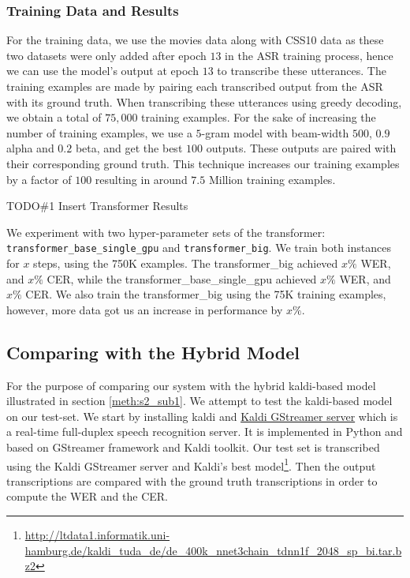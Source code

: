 \subsubsection{Training Data and Results}
\label{meth:s4_sub7_subsub2}

For the training data, we use the movies data along with CSS10 data as these two datasets were only added after epoch $13$ in the \ac{ASR} training process, hence we can use the model's output at epoch $13$ to transcribe these utterances. The training examples are made by pairing each transcribed output from the \ac{ASR} with its ground truth. When transcribing these utterances using greedy decoding, we obtain a total of $75,000$ training examples. For the sake of increasing the number of training examples, we use a $5$-gram model with beam-width $500$, $0.9$ alpha and $0.2$ beta, and get the best $100$ outputs. These outputs are paired with their corresponding ground truth. This technique increases our training examples by a factor of $100$ resulting in around $7.5$ Million training examples. 

TODO\#1 Insert Transformer Results

We experiment with two hyper-parameter sets of the transformer: \texttt{transformer\_base\_single\_gpu} and \texttt{transformer\_big}. We train both instances for $x$ steps, using the 750K examples.
The transformer\_big achieved $x\%$ \ac{WER}, and $x\%$ \ac{CER}, while the transformer\_base\_single\_gpu  achieved $x\%$ \ac{WER}, and $x\%$ \ac{CER}. 
We also train the transformer\_big using the 75K training examples, however, more data got us an increase in performance by $x\%$.



\subsection{Comparing with the Hybrid Model}
\label{meth:s4_sub8}

For the purpose of comparing our system with the hybrid kaldi-based model \cite{milde2018open} illustrated in section \ref{meth:s2_sub1}. We attempt to test the kaldi-based model on our test-set. We start by installing kaldi and \href{https://github.com/alumae/kaldi-gstreamer-server}{Kaldi GStreamer server} which is a real-time full-duplex speech recognition server. It is implemented in Python and based on GStreamer framework and Kaldi toolkit. Our test set is transcribed using the Kaldi GStreamer server and Kaldi's best model\footnote{\url{http://ltdata1.informatik.uni-hamburg.de/kaldi_tuda_de/de_400k_nnet3chain_tdnn1f_2048_sp_bi.tar.bz2}}. Then the output transcriptions are compared with the ground truth transcriptions in order to compute the \ac{WER} and the \ac{CER}. 


